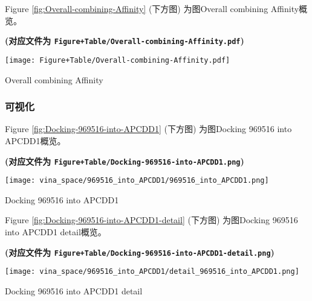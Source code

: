 \documentclass[
]{article}
\newenvironment{Shaded}{\begin{snugshade}}{\end{snugshade}}
\newcommand{\DataTypeTok}[1]{\textcolor[rgb]{0.13,0.29,0.53}{#1}}
\newcommand{\DecValTok}[1]{\textcolor[rgb]{0.00,0.00,0.81}{#1}}
\newcommand{\KeywordTok}[1]{\textcolor[rgb]{0.13,0.29,0.53}{\textbf{#1}}}
\newcommand{\NormalTok}[1]{#1}
\newcommand{\OperatorTok}[1]{\textcolor[rgb]{0.81,0.36,0.00}{\textbf{#1}}}
\newcommand{\StringTok}[1]{\textcolor[rgb]{0.31,0.60,0.02}{#1}}
\begin{document}
Figure \ref{fig:Overall-combining-Affinity} (下方图) 为图Overall combining Affinity概览。

\textbf{(对应文件为 \texttt{Figure+Table/Overall-combining-Affinity.pdf})}

\def\@captype{figure}
\begin{center}
\texttt{[image: Figure+Table/Overall-combining-Affinity.pdf]}
\caption{Overall combining Affinity}\label{fig:Overall-combining-Affinity}
\end{center}

\hypertarget{ux53efux89c6ux5316}{%
\subsubsection{可视化}\label{ux53efux89c6ux5316}}

\begin{Shaded}
\end{Shaded}

Figure \ref{fig:Docking-969516-into-APCDD1} (下方图) 为图Docking 969516 into APCDD1概览。

\textbf{(对应文件为 \texttt{Figure+Table/Docking-969516-into-APCDD1.png})}

\def\@captype{figure}
\begin{center}
\texttt{[image: vina\_space/969516\_into\_APCDD1/969516\_into\_APCDD1.png]}
\caption{Docking 969516 into APCDD1}\label{fig:Docking-969516-into-APCDD1}
\end{center}

Figure \ref{fig:Docking-969516-into-APCDD1-detail} (下方图) 为图Docking 969516 into APCDD1 detail概览。

\textbf{(对应文件为 \texttt{Figure+Table/Docking-969516-into-APCDD1-detail.png})}

\def\@captype{figure}
\begin{center}
\texttt{[image: vina\_space/969516\_into\_APCDD1/detail\_969516\_into\_APCDD1.png]}
\caption{Docking 969516 into APCDD1 detail}\label{fig:Docking-969516-into-APCDD1-detail}
\end{center}
\end{document}
